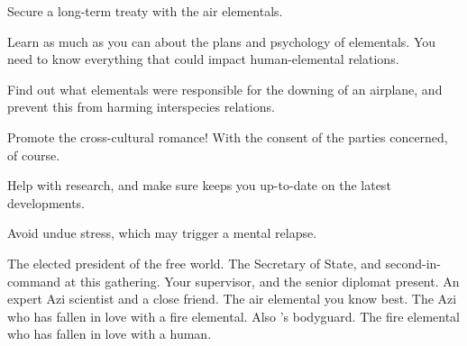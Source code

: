 \documentclass[char]{elementals}
\begin{document}
\begin{itemz}[Goals]
	\item  Secure a long-term treaty with the air elementals.
	\item  Learn as much as you can about the plans and psychology of elementals.  You need to know everything that could impact human-elemental relations.
	\item  Find out what elementals were responsible for the downing of an airplane, and prevent this from harming interspecies relations.
	\item  Promote the cross-cultural romance!  With the consent of the parties concerned, of course.
	\item  Help \cScientist{} with \cScientist{\their} research, and make sure \cScientist{\they} keeps you up-to-date on the latest developments.
	\item  Avoid undue stress, which may trigger a mental relapse.
\end{itemz}

\begin{contacts}
	\contact{\cLeader{}}  The elected president of the free world.
	\contact{\cDema{}}  The Secretary of State, and second-in-command at this gathering.
	\contact{\cAvatar{}}  Your supervisor, and the senior diplomat present.
	\contact{\cScientist{}}  An expert Azi scientist and a close friend.
	\contact{\cNaturalist{}}  The air elemental you know best. 
	\contact{\cRomeo{}}  The Azi who has fallen in love with a fire elemental.  Also \cLeader{}'s bodyguard.
	\contact{\cJuliet{}}  The fire elemental who has fallen in love with a human.
\end{contacts}
\end{document}
